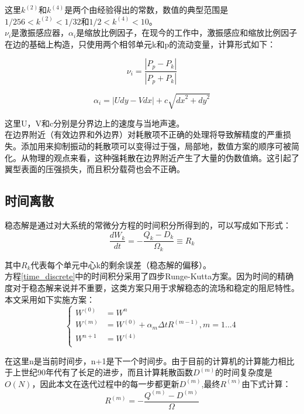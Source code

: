 \documentclass[UTF8]{ctexart}
\begin{document}
\indent 这里$k^{(2)}$和$k^{(4)}$是两个由经验得出的常数，数值的典型范围是$1/256<k^{(2)}<1/32$和$1/2<k^{(4)}<10$。\\
\indent $\nu_i$是激振感应器，$\alpha_i$是缩放比例因子，在现今的工作中，激振感应和缩放比例因子在边的基础上构造，只使用两个相邻单元k和p的流动变量，计算形式如下：

\begin{equation}
\nu_i=\frac{\left|P_p-P_k\right|}{\left|P_p+P_k\right|}
\end{equation}

\begin{equation}\label{suofangyinzi}
\alpha_i=\left|Udy-Vdx\right|+c\sqrt{{dx}^2+{dy}^2}
\end{equation}

\indent 这里U，V和c分别是分界边上的速度与当地声速。\\
\indent 在边界附近（有效边界和外边界）对耗散项不正确的处理将导致解精度的严重损失。添加用来抑制振动的耗散项可以变得过于强，局部地，数值方案的顺序可被简化。从物理的观点来看，这种强耗散在边界附近产生了大量的伪数值熵。这引起了翼型表面的压强损失，而且积分载荷也会不正确。

\subsection{时间离散}
稳态解是通过对大系统的常微分方程的时间积分所得到的，可以写成如下形式：
\begin{equation}\label{time_discrete}
\frac{dW_k}{dt}=-\frac{Q_k-D_k}{\Omega_k} \equiv R_k
\end{equation}

\indent 其中$R_k$代表每个单元中心k的剩余误差（稳态解的偏移）。\\
\indent 方程\eqref{time_discrete}中的时间积分采用了四步Runge-Kutta方案。因为时间的精确度对于稳态解来说并不重要，这类方案只用于求解稳态的流场和稳定的阻尼特性。本文采用如下实施方案：
\begin{equation}\label{runge-kutta}
\left\{
\begin{aligned}
W^{(0)} &= W^n \\
W^{(m)} &= W^{(0)}+\alpha_m \Delta t R^{(m-1)},m=1...4 \\
W^{n+1} &= W^{(4)}\\
\end{aligned}
\right.
\end{equation}

\indent 在这里n是当前时间步，n+1是下一个时间步。由于目前的计算机的计算能力相比于上世纪90年代有了长足的进步，而且计算耗散函数$D^{(m)}$的时间复杂度是$O(N)$，因此本文在迭代过程中的每一步都更新$D^{(m)}$,最终$R^{(m)}$由下式计算：
\begin{equation}\label{residual}
R^{(m)}=-\frac{Q^{(m)}-D^{(m)}}{\Omega}
\end{equation}
\end{document}

